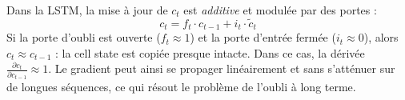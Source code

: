 {\begin{enumerate}
{			Dans la LSTM, la mise à jour de $c_t$ est \emph{additive} et modulée par des portes :
			\[
			c_t = f_t \cdot c_{t-1} + i_t \cdot \tilde{c}_t
			\]
			Si la porte d'oubli est ouverte ($f_t \approx 1$) et la porte d'entrée fermée ($i_t \approx 0$), alors $c_t \approx c_{t-1}$ : la cell state est copiée presque intacte. Dans ce cas, la dérivée $\frac{\partial c_t}{\partial c_{t-1}} \approx 1$. Le gradient peut ainsi se propager linéairement et sans s'atténuer sur de longues séquences, ce qui résout le problème de l'oubli à long terme.
		}
	\end{enumerate}
}